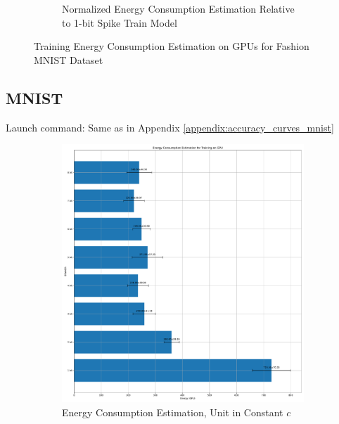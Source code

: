 \begin{figure}[H]
\begin{subfigure}[H]{0.48\textwidth}
                \caption{Normalized Energy Consumption Estimation Relative to 1-bit Spike Train Model}
            \end{subfigure}
            \caption{Training Energy Consumption Estimation on GPUs for Fashion MNIST Dataset}
        \end{figure}

    \subsection{MNIST}
    \label{appendix:energy_gpu_mnist}
        Launch command: Same as in Appendix \ref{appendix:accuracy_curves_mnist}

        \begin{figure}[H]
            \centering
            \begin{subfigure}[H]{0.48\textwidth}
                \includegraphics[width=\textwidth]{../standard/MNIST/plots/mnist_train_energy_gpu.pdf}
                \caption{Energy Consumption Estimation, Unit in Constant $c$}
            \end{subfigure}
            \hfill
            \begin{subfigure}[H]{0.48\textwidth}

\end{subfigure}
\end{figure}
